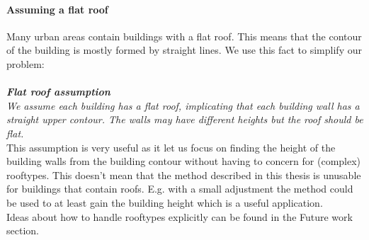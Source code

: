 	\paragraph{Assuming a flat roof}
	Many urban areas contain buildings with a flat roof. This means that the
	contour of the building is mostly formed by straight lines.  We use this
	fact to simplify our problem:\\\\
	\textbf{\emph{Flat roof assumption}}\\
	\emph{We assume each building has a flat roof, implicating that each building wall
	has a straight upper contour. The walls may have different heights but the roof should be flat.}\\

	This assumption is very useful as it let us focus on finding the height
	of the building walls from the building contour without having to concern
	for (complex) rooftypes.  This doesn't mean that the method described in
		this thesis is unusable for buildings that contain roofs. E.g.
		with a small adjustment the method could be used to at least
		gain the building height which is a useful application.\\
	Ideas about how to handle rooftypes explicitly can be found in the
	Future work section.\\

